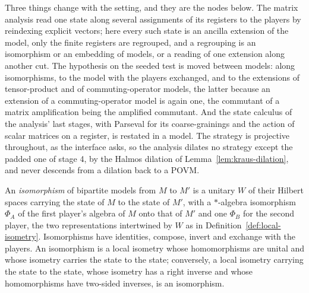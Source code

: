 Three things change with the setting, and they are the nodes below. The matrix analysis read one
state along several assignments of its registers to the players by reindexing explicit vectors;
here every such state is an ancilla extension of the model, only the finite registers are
regrouped, and a regrouping is an isomorphism or an embedding of models, or a reading of one
extension along another cut. The hypothesis on the seeded test is moved between models: along
isomorphisms, to the model with the players exchanged, and to the extensions of tensor-product and
of commuting-operator models, the latter because an extension of a commuting-operator model is
again one, the commutant of a matrix amplification being the amplified commutant. And the state
calculus of the analysis' last stages, with Parseval for its coarse-grainings and the action of
scalar matrices on a register, is restated in a model. The strategy is projective throughout, as
the interface asks, so the analysis dilates no strategy except the padded one of stage 4, by the
Halmos dilation of Lemma~\ref{lem:kraus-dilation}, and never descends from a dilation back to a
POVM.

\begin{definition}
\label{def:model-iso}
\leanok
An \emph{isomorphism} of bipartite models from $M$ to $M'$ is a unitary $W$ of their Hilbert
spaces carrying the state of $M$ to the state of $M'$, with a $*$-algebra isomorphism $\Phi_A$ of
the first player's algebra of $M$ onto that of $M'$ and one $\Phi_B$ for the second player, the
two representations intertwined by $W$ as in Definition~\ref{def:local-isometry}. Isomorphisms have
identities, compose, invert and exchange with the players. An isomorphism is a local isometry whose
homomorphisms are unital and whose isometry carries the state to the state; conversely, a local
isometry carrying the state to the state, whose isometry has a right inverse and whose
homomorphisms have two-sided inverses, is an isomorphism.
\end{definition}

